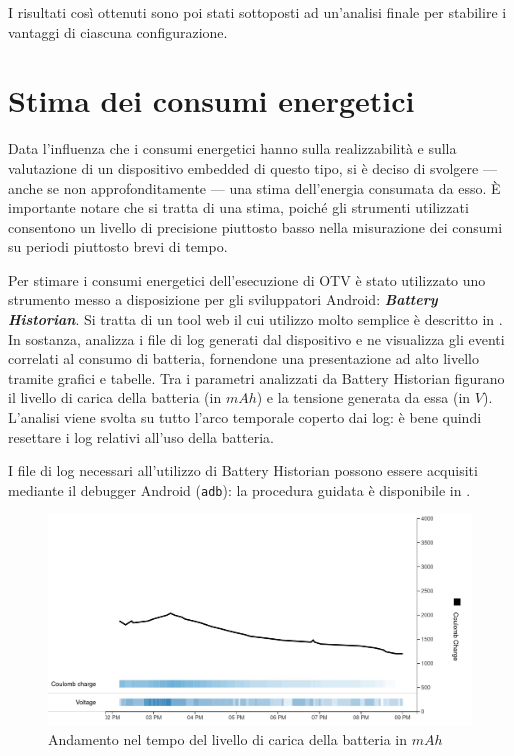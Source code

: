 \vspace{1em}

I risultati così ottenuti sono poi stati sottoposti ad un'analisi finale per stabilire i vantaggi di ciascuna configurazione. 

\section{Stima dei consumi energetici}
\label{sec:stimaconsumi}

Data l'influenza che i consumi energetici hanno sulla realizzabilità e sulla valutazione di un dispositivo embedded di questo
tipo, si è deciso di svolgere --- anche se non approfonditamente --- una stima dell'energia consumata da esso.
È importante notare che si tratta di una stima, poiché gli strumenti utilizzati consentono un livello di precisione piuttosto
basso nella misurazione dei consumi su periodi piuttosto brevi di tempo.

Per stimare i consumi energetici dell'esecuzione di OTV è stato utilizzato uno strumento messo a disposizione per gli 
sviluppatori Android: \textit{\textbf{Battery Historian}}. Si tratta di un tool web il cui utilizzo molto semplice è 
descritto in \cite{adev_battery}. In sostanza, analizza i file di log generati dal dispositivo e ne visualizza gli eventi
correlati al consumo di batteria, fornendone una presentazione ad alto livello tramite grafici e tabelle.
Tra i parametri analizzati da Battery Historian figurano il livello di carica della batteria (in $mAh$) e la tensione generata
da essa (in $V$). L'analisi viene svolta su tutto l'arco temporale coperto dai log: è bene quindi resettare i log relativi
all'uso della batteria.

I file di log necessari all'utilizzo di Battery Historian possono essere acquisiti mediante il debugger Android (\texttt{adb}): 
la procedura guidata è disponibile in \cite{adev_batlog}.

\begin{figure}[h!]
    \begin{center}
        \includegraphics[scale=0.28]{img/battery_historian_coulomb.jpg}
        \caption{Andamento nel tempo del livello di carica della batteria in $mAh$}
    \end{center}
\end{figure}

